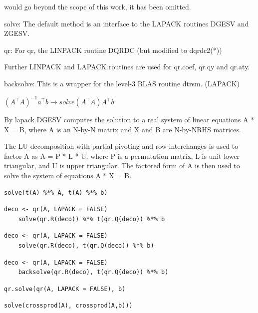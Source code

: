  would go beyond the scope of this work, it has been omitted. 



solve: The default method is an interface to the LAPACK routines DGESV and ZGESV.

qr: For qr, the LINPACK routine DQRDC (but modified to dqrdc2(*))

Further LINPACK and LAPACK routines are used for qr.coef, qr.qy and qr.aty.

backsolve: This is a wrapper for the level-3 BLAS routine dtrsm. (LAPACK)

$(A^\top A)^{-1}a^\top b \rightarrow solve(A^\top A) A^\top b$

By lapack \cite{lapack}
DGESV computes the solution to a real system of linear equations
A * X = B,
where A is an N-by-N matrix and X and B are N-by-NRHS matrices.

The LU decomposition with partial pivoting and row interchanges is
used to factor A as
A = P * L * U,
where P is a permutation matrix, L is unit lower triangular, and U is
upper triangular.  The factored form of A is then used to solve the
system of equations A * X = B.


\begin{lstlisting}[otherkeywords={\%*\%}]
	solve(t(A) %*% A, t(A) %*% b)
\end{lstlisting}

\begin{lstlisting}[otherkeywords={\%*\%, qr.R}]
	deco <- qr(A, LAPACK = FALSE)
	solve(qr.R(deco)) %*% t(qr.Q(deco)) %*% b
\end{lstlisting}

\begin{lstlisting}[otherkeywords={\%*\%, qr.R}]
	deco <- qr(A, LAPACK = FALSE)
	solve(qr.R(deco), t(qr.Q(deco)) %*% b)
\end{lstlisting}

\begin{lstlisting}[otherkeywords={\%*\%, qr.R}]
	deco <- qr(A, LAPACK = FALSE)
	backsolve(qr.R(deco), t(qr.Q(deco)) %*% b)
\end{lstlisting}

\begin{lstlisting}[otherkeywords={\%*\%}]
	qr.solve(qr(A, LAPACK = FALSE), b)
\end{lstlisting}

\begin{lstlisting}[otherkeywords={\%*\%}]
	solve(crossprod(A), crossprod(A,b)))
\end{lstlisting}


